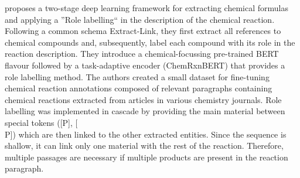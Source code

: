 \cite{guo2021automated} proposes a two-stage deep learning framework for extracting chemical formulas and applying a ''Role labelling`` in the description of the chemical reaction. 
Following a common schema Extract-Link, they first extract all references to chemical compounds and, subsequently, label each compound with its role in the reaction description. 
They introduce a chemical-focussing pre-trained BERT flavour followed by a task-adaptive encoder (ChemRxnBERT) that provides a role labelling method. 
The authors created a small dataset for fine-tuning chemical reaction annotations composed of relevant paragraphs containing chemical reactions extracted from articles in various chemistry journals. 
Role labelling was implemented in cascade by providing the main material between special tokens ([P], [\\P]) which are then linked to the other extracted entities. Since the sequence is shallow, it can link only one material with the rest of the reaction. Therefore, multiple passages are necessary if multiple products are present in the reaction paragraph.  






